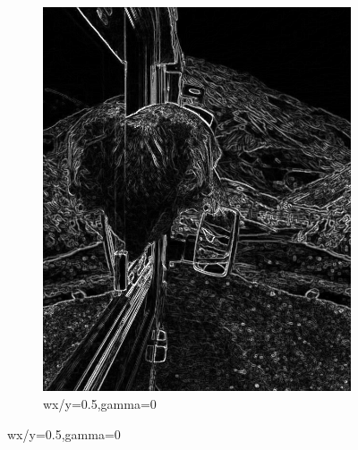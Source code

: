 \documentclass[a4paper, 12pt]{article}
\begin{document}
\begin{figure}[!ht]
\begin{subfigure}{0.4\textwidth}
        \includegraphics[width=\textwidth]{img/dog-spatial.png}
        \caption{wx/y=0.5,gamma=0}
    \end{subfigure}
\end{figure}



\nocite{*}
\end{document}

